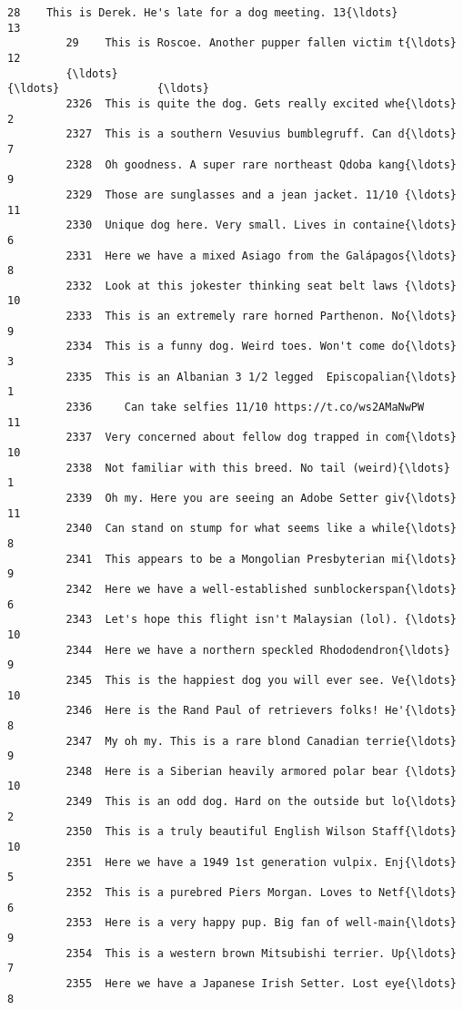 \documentclass[11pt]{article}
\begin{document}
\begin{Verbatim}[commandchars=\\\{\}]
         28    This is Derek. He's late for a dog meeting. 13{\ldots}                13   
         29    This is Roscoe. Another pupper fallen victim t{\ldots}                12   
         {\ldots}                                                 {\ldots}               {\ldots}   
         2326  This is quite the dog. Gets really excited whe{\ldots}                 2   
         2327  This is a southern Vesuvius bumblegruff. Can d{\ldots}                 7   
         2328  Oh goodness. A super rare northeast Qdoba kang{\ldots}                 9   
         2329  Those are sunglasses and a jean jacket. 11/10 {\ldots}                11   
         2330  Unique dog here. Very small. Lives in containe{\ldots}                 6   
         2331  Here we have a mixed Asiago from the Galápagos{\ldots}                 8   
         2332  Look at this jokester thinking seat belt laws {\ldots}                10   
         2333  This is an extremely rare horned Parthenon. No{\ldots}                 9   
         2334  This is a funny dog. Weird toes. Won't come do{\ldots}                 3   
         2335  This is an Albanian 3 1/2 legged  Episcopalian{\ldots}                 1   
         2336     Can take selfies 11/10 https://t.co/ws2AMaNwPW                11   
         2337  Very concerned about fellow dog trapped in com{\ldots}                10   
         2338  Not familiar with this breed. No tail (weird){\ldots}                 1   
         2339  Oh my. Here you are seeing an Adobe Setter giv{\ldots}                11   
         2340  Can stand on stump for what seems like a while{\ldots}                 8   
         2341  This appears to be a Mongolian Presbyterian mi{\ldots}                 9   
         2342  Here we have a well-established sunblockerspan{\ldots}                 6   
         2343  Let's hope this flight isn't Malaysian (lol). {\ldots}                10   
         2344  Here we have a northern speckled Rhododendron{\ldots}                 9   
         2345  This is the happiest dog you will ever see. Ve{\ldots}                10   
         2346  Here is the Rand Paul of retrievers folks! He'{\ldots}                 8   
         2347  My oh my. This is a rare blond Canadian terrie{\ldots}                 9   
         2348  Here is a Siberian heavily armored polar bear {\ldots}                10   
         2349  This is an odd dog. Hard on the outside but lo{\ldots}                 2   
         2350  This is a truly beautiful English Wilson Staff{\ldots}                10   
         2351  Here we have a 1949 1st generation vulpix. Enj{\ldots}                 5   
         2352  This is a purebred Piers Morgan. Loves to Netf{\ldots}                 6   
         2353  Here is a very happy pup. Big fan of well-main{\ldots}                 9   
         2354  This is a western brown Mitsubishi terrier. Up{\ldots}                 7   
         2355  Here we have a Japanese Irish Setter. Lost eye{\ldots}                 8   
         

\end{Verbatim}
\end{document}

